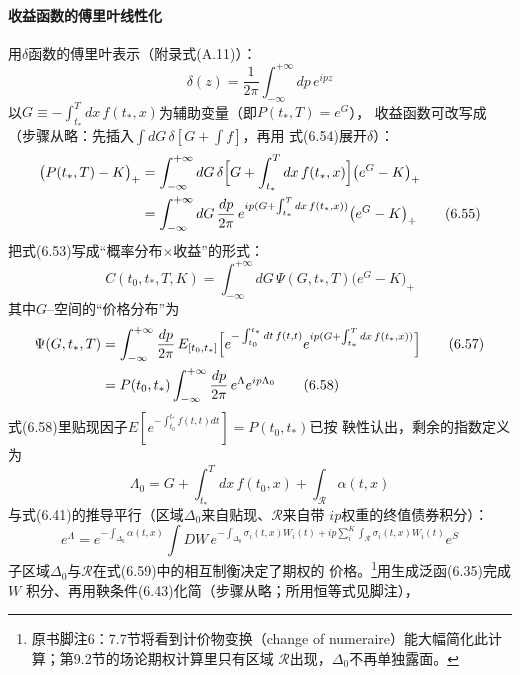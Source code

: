 \paragraph{收益函数的傅里叶线性化}
用$\delta$函数的傅里叶表示（附录式(A.11)）：
\begin{equation*}
\delta(z)=\frac{1}{2\pi}\int_{-\infty}^{+\infty}dp\,e^{ipz}
\tag{6.54}
\end{equation*}
以$G\equiv-\int_{t_*}^{T}dx\,f(t_*,x)$为辅助变量（即$P(t_*,T)=e^G$），
收益函数可改写成（步骤从略：先插入$\int dG\,\delta[G+\int f]$，再用
式(6.54)展开$\delta$）：
\begin{align*}
\bigl(P(t_*,T)-K\bigr)_+
&=\int_{-\infty}^{+\infty}dG\,\delta\Bigl[G+\int_{t_*}^{T}dx\,
f(t_*,x)\Bigr]\bigl(e^{G}-K\bigr)_+\\
&=\int_{-\infty}^{+\infty}dG\,\frac{dp}{2\pi}\,
e^{ip(G+\int_{t_*}^{T}dx\,f(t_*,x))}\bigl(e^{G}-K\bigr)_+
\tag{6.55}
\end{align*}
把式(6.53)写成“概率分布$\times$收益”的形式：
\begin{equation*}
C(t_0,t_*,T,K)=\int_{-\infty}^{+\infty}dG\,\Psi(G,t_*,T)
\bigl(e^{G}-K\bigr)_+
\tag{6.56}
\end{equation*}
其中$G$--空间的“价格分布”为
\begin{align*}
\Psi(G,t_*,T)&=\int_{-\infty}^{+\infty}\frac{dp}{2\pi}\,
E_{[t_0,t_*]}\Bigl[e^{-\int_{t_0}^{t_*}dt\,f(t,t)}
e^{ip(G+\int_{t_*}^{T}dx\,f(t_*,x))}\Bigr]
\tag{6.57}\\
&=P(t_0,t_*)\int_{-\infty}^{+\infty}\frac{dp}{2\pi}\,
e^{\Lambda}e^{ip\Lambda_0}
\tag{6.58}
\end{align*}
式(6.58)里贴现因子$E[e^{-\int_{t_0}^{t_*}f(t,t)dt}]=P(t_0,t_*)$已按
鞅性认出，剩余的指数定义为
\begin{equation*}
\Lambda_0=G+\int_{t_*}^{T}dx\,f(t_0,x)+\int_{\mathcal{R}}\alpha(t,x)
\end{equation*}
与式(6.41)的推导平行（区域$\Delta_0$来自贴现、$\mathcal{R}$来自带
$ip$权重的终值债券积分）：
\begin{equation*}
e^{\Lambda}=e^{-\int_{\Delta_0}\alpha(t,x)}
\int DW\,e^{-\int_{\Delta_0}\sigma_i(t,x)W_i(t)
+ip\sum_i^{K}\int_{\mathcal{R}}\sigma_i(t,x)W_i(t)}e^{S}
\tag{6.59}
\end{equation*}
子区域$\Delta_0$与$\mathcal{R}$在式(6.59)中的相互制衡决定了期权的
价格。\footnote{原书脚注6：7.7节将看到计价物变换（change of
numeraire）能大幅简化此计算；第9.2节的场论期权计算里只有区域
$\mathcal{R}$出现，$\Delta_0$不再单独露面。}用生成泛函(6.35)完成$W$
积分、再用鞅条件(6.43)化简（步骤从略；所用恒等式见脚注），
